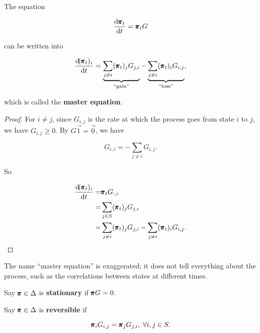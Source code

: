 \begin{theorem}
    The equation 

    \begin{equation*}
        \frac{\dif \mbf{\pi}_t}{\dif t} = \mbf{\pi}_t G
    \end{equation*}
    
    can be written into

    \begin{equation*}
        \frac{\dif (\mbf{\pi}_t)_i}{\dif t} = \underbrace{\sum_{j \neq i} (\mbf{\pi}_t)_j G_{j, i}}_{\text{``gain''}}  - \underbrace{\sum_{j \neq i} (\mbf{\pi}_t)_i G_{i, j}}_{\text{``loss''}},
    \end{equation*}

    which is called the \textbf{master equation}.

    \begin{proof}
        For $i \neq j$, since $G_{i,j}$ is the rate at which the process goes from state $i$ to $j$, we have $G_{i,j} \ge 0$. By $G \vec{1} = \vec{0}$, we have 
    
        \begin{equation*}
            G_{i, i} = - \sum_{j \neq i} G_{i, j}.
        \end{equation*}
    
        So 
    
        \begin{align*}
            \frac{\dif (\mbf{\pi}_t)_i}{\dif t} = & \mbf{\pi}_t G_{:, i} \\ 
            = & \sum_{j \in S} (\mbf{\pi}_t)_j G_{j, i} \\ 
            = & \sum_{j \neq i} (\mbf{\pi}_t)_j G_{j, i} - \sum_{j \neq i} (\mbf{\pi}_t)_i G_{i, j}.
        \end{align*}
    \end{proof}
\end{theorem}

\begin{remark}
    The name ``master equation'' is exaggerated; it does not tell everything about the process, such as the correlations between states at different times.
\end{remark}

\begin{definition}[Stationarity]
    Say $\pmb{\pi} \in \Delta$ is \textbf{stationary} if $\pmb{\pi} G = 0$.
\end{definition}

\begin{definition}[Reversibility]
    Say $\pmb{\pi} \in \Delta$ is \textbf{reversible} if 

    \begin{equation*}
        \pmb{\pi}_i G_{i,j} = \pmb{\pi}_j G_{j, i}, \; \forall i,j \in S.
    \end{equation*}
\end{definition}

